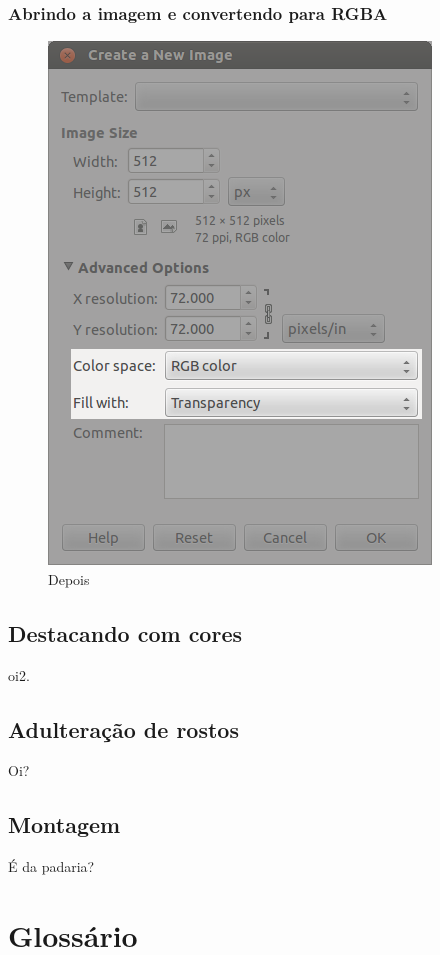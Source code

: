 \documentclass[12pt,onecolumn]{article}
\begin{document}
    \subsubsection{Abrindo a imagem e convertendo para RGBA}
    \begin{figure}[H]
      \centering
      \includegraphics[width=.7\linewidth]{screenshots/00-grayscale_to_RGBA.png}
      \caption{Depois}
      \label{fig:grayscale_to_RGBA}
    \end{figure}
    
  \subsection{Destacando com cores}
    oi2.

  \subsection{Adulteração de rostos}
    Oi?

  \subsection{Montagem}
    É da padaria?

\section{Glossário}
\end{document}
